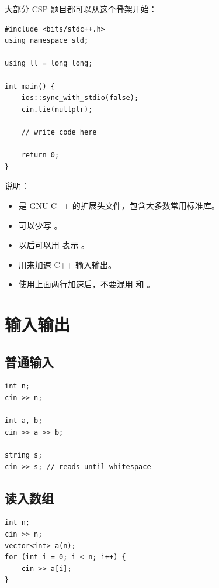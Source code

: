 大部分 CSP 题目都可以从这个骨架开始：

\begin{lstlisting}
#include <bits/stdc++.h>
using namespace std;

using ll = long long;

int main() {
    ios::sync_with_stdio(false);
    cin.tie(nullptr);

    // write code here

    return 0;
}
\end{lstlisting}

说明：

\begin{itemize}
  \item {} 是 GNU C++ 的扩展头文件，包含大多数常用标准库。
  \item {} 可以少写 。
  \item {} 以后可以用  表示 。
  \item {} 用来加速 C++ 输入输出。
  \item 使用上面两行加速后，不要混用  和 。
\end{itemize}

\section{输入输出}\label{sec:04-4}

\subsection{普通输入}

\begin{lstlisting}
int n;
cin >> n;

int a, b;
cin >> a >> b;

string s;
cin >> s; // reads until whitespace
\end{lstlisting}

\subsection{读入数组}

\begin{lstlisting}
int n;
cin >> n;
vector<int> a(n);
for (int i = 0; i < n; i++) {
    cin >> a[i];
}
\end{lstlisting}


